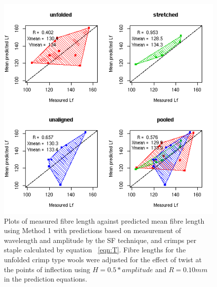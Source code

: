 %

\begin{figure}[!h]
  \centering
  \includegraphics[width=1.1\textwidth]{figsfpredlftc.png}
  \caption{Plots of measured fibre length against predicted mean fibre length using Method 1 with predictions based on measurement of wavelength and amplitude by the SF technique, and crimps per staple calculated by equation ~\ref{eqn:T}. Fibre lengths for the unfolded crimp type wools were adjusted for the effect of twist at the points of inflection using $H = 0.5 * amplitude$ and $R = 0.10 mm$ in the prediction equations.}
  \label{fig:sfpredlftc}
\end{figure}

%

